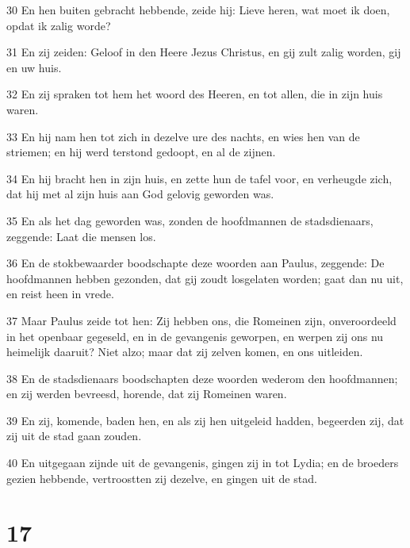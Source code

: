 \par 30 En hen buiten gebracht hebbende, zeide hij: Lieve heren, wat moet ik doen, opdat ik zalig worde?
\par 31 En zij zeiden: Geloof in den Heere Jezus Christus, en gij zult zalig worden, gij en uw huis.
\par 32 En zij spraken tot hem het woord des Heeren, en tot allen, die in zijn huis waren.
\par 33 En hij nam hen tot zich in dezelve ure des nachts, en wies hen van de striemen; en hij werd terstond gedoopt, en al de zijnen.
\par 34 En hij bracht hen in zijn huis, en zette hun de tafel voor, en verheugde zich, dat hij met al zijn huis aan God gelovig geworden was.
\par 35 En als het dag geworden was, zonden de hoofdmannen de stadsdienaars, zeggende: Laat die mensen los.
\par 36 En de stokbewaarder boodschapte deze woorden aan Paulus, zeggende: De hoofdmannen hebben gezonden, dat gij zoudt losgelaten worden; gaat dan nu uit, en reist heen in vrede.
\par 37 Maar Paulus zeide tot hen: Zij hebben ons, die Romeinen zijn, onveroordeeld in het openbaar gegeseld, en in de gevangenis geworpen, en werpen zij ons nu heimelijk daaruit? Niet alzo; maar dat zij zelven komen, en ons uitleiden.
\par 38 En de stadsdienaars boodschapten deze woorden wederom den hoofdmannen; en zij werden bevreesd, horende, dat zij Romeinen waren.
\par 39 En zij, komende, baden hen, en als zij hen uitgeleid hadden, begeerden zij, dat zij uit de stad gaan zouden.
\par 40 En uitgegaan zijnde uit de gevangenis, gingen zij in tot Lydia; en de broeders gezien hebbende, vertroostten zij dezelve, en gingen uit de stad.

\chapter{17}

